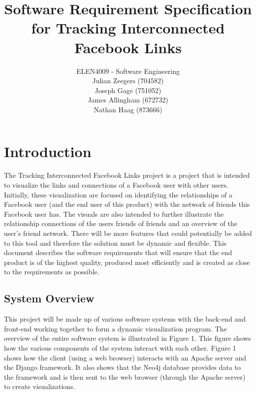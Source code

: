 \documentclass[10pt,onecolumn]{article}
\title{\vspace{-4.2cm}Software Requirement Specification for Tracking Interconnected Facebook Links }
\author{ ELEN4009 - Software Engineering\\ Julian Zeegers (704582) \\  Joseph Gage (751052)\\ James Allingham (672732) \\ Nathan Haag (873666)}
\begin{document}
\date{\vspace{-5ex}}
\maketitle
\pagestyle{plain}
\setcounter{page}{1}



\section{Introduction}
The Tracking Interconnected Facebook Links project is a project that  is intended to visualize the links and connections of a Facebook user with other users. Initially, these visualization are focused on identifying the relationships of a Facebook user (and the end user of this product) with the network of friends this Facebook user has. The visuals are also intended to further illustrate the relationship connections of the users friends of friends and an overview of the user's friend network. There will be more features that could potentially be added to this tool and therefore the solution must be dynamic and flexible. This document describes the software requirements that will ensure that the end product is of the highest quality, produced most efficiently and is created as close to the requirements as possible.

\subsection{System Overview}
This project will be made up of various software systems with the back-end and front-end working together to form a dynamic visualization program. The overview of the entire software system is illustrated in Figure 1. This figure shows how the various components of the system interact with each other. Figure 1 shows how the client (using a web browser) interacts with an Apache server and the Django framework. It also shows that the Neo4j database provides data to the framework and is then sent to the web browser (through the Apache server) to create visualizations.
\end{document}
